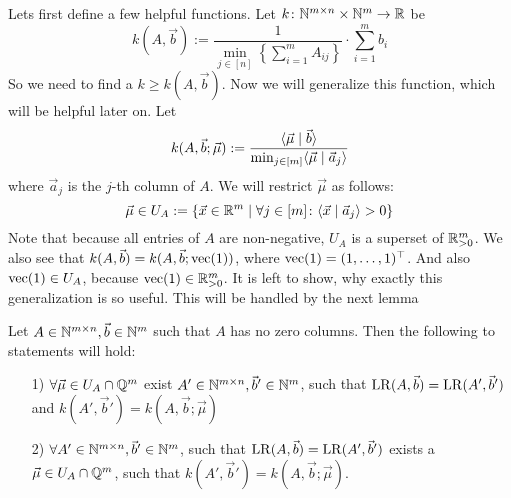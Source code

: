 Lets first define a few helpful functions. Let $k\colon \mathbb{N}^{m \times n} \times \mathbb{N}^m \to \mathbb{R}$ be
$$k(A, \vec b) := \frac{1}{\min_{j \in [n]} \left\{ \sum_{i=1}^{m}A_{ij}\right\}}\cdot \sum_{i=1}^{m}b_i$$
So we need to find a $k \geq k(A, \vec b)$. Now we will generalize this function, which will be helpful later on. Let 
$$k(A, \vec b; \vec \mu) := \frac{\langle \vec{\mu} \mid \vec b \rangle}{\min_{j \in [m]} \langle \vec \mu \mid \vec a_j \rangle}$$
where $\vec a_j$ is the $j$-th column of $A$. We will restrict $\vec \mu$ as follows:
$$\vec \mu \in U_A := \{\vec x \in \mathbb{R}^m \mid \forall j \in [m]\colon \langle \vec x \mid \vec a_j \rangle > 0\}$$
Note that because all entries of $A$ are non-negative, $U_A$ is a superset of $\mathbb{R}_{>0}^m$. We also see that $k(A, \vec b) = k(A, \vec b; \operatorname{vec}(1))$, where $\operatorname{vec}(1) = (1, \dots, 1)^\top$. And also $\operatorname{vec}(1) \in U_A$, because $\operatorname{vec}(1) \in \mathbb{R}^m_{>0}$. It is left to show, why exactly this generalization is so useful. This will be handled by the next lemma
\begin{lemma}
    Let $A \in \mathbb{N}^{m \times n}, \vec b \in \mathbb{N}^m$ such that $A$ has no zero columns. Then the following to statements will hold:
    \begin{enumerate}
        \item[1)] $\forall \vec \mu \in U_A \cap \mathbb{Q}^m$ exist $A' \in \mathbb{N}^{m \times n}, \vec b' \in \mathbb{N}^m$, such that $\operatorname{LR}(A, \vec b) = \operatorname{LR}(A', \vec b')$ and
        $k(A', \vec b') = k(A, \vec b; \vec\mu)$
        \item[2)] $\forall  A' \in \mathbb{N}^{m \times n}, \vec b' \in \mathbb{N}^m$, such that $\operatorname{LR}(A, \vec b) = \operatorname{LR}(A', \vec b')$ exists a $\vec \mu \in U_A \cap \mathbb{Q}^m$, such that 
        $k(A', \vec b') = k(A, \vec b; \vec\mu)$.
    \end{enumerate}
\end{lemma}
